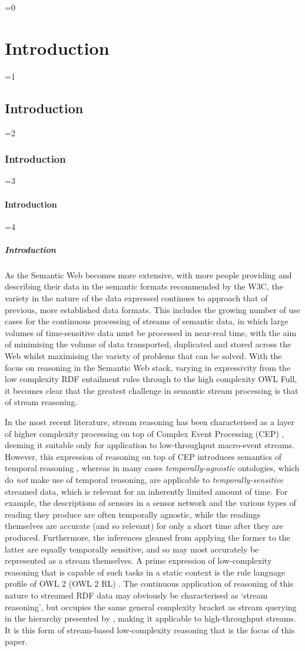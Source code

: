 \documentclass[twocolumn,preprint,3p,number]{elsarticle}
\theoremstyle{plain}
\theoremstyle{definition}
\newcounter{nestingdepth}
\newenvironment{nestedsection}[2]{
  \ifnum\value{nestingdepth}=0
    \chapter{#1}
  \else
    \ifnum\value{nestingdepth}=1
      \section{#1}
    \else
      \ifnum\value{nestingdepth}=2
        \subsection{#1}
      \else
        \ifnum\value{nestingdepth}=3
          \subsubsection{#1}
        \else
          \ifnum\value{nestingdepth}=4
            \paragraph{#1}
          \else
            \PackageError{nestedsections}{Maximum nesting level exceeded!}{uh oh!}
          \fi
        \fi
      \fi
    \fi
  \fi
  \addtocounter{nestingdepth}{1}
  \label{sec:#2}
}{\addtocounter{nestingdepth}{-1}}
\begin{document}
\begin{nestedsection}{Introduction}{intro}
  As the Semantic Web becomes more extensive, with more people providing and describing their data in the semantic formats recommended by the W3C, the variety in the nature of the data expressed continues to approach that of previous, more established data formats.
  This includes the growing number of use cases for the continuous processing of streams of semantic data, in which large volumes of time-sensitive data must be processed in near-real time, with the aim of minimising the volume of data transported, duplicated and stored across the Web whilst maximising the variety of problems that can be solved.
  With the focus on reasoning in the Semantic Web stack, varying in expressivity from the low complexity RDF entailment rules through to the high complexity OWL Full, it becomes clear that the greatest challenge in semantic stream processing is that of stream reasoning.

  In the most recent literature, stream reasoning has been characterised as a layer of higher complexity processing on top of Complex Event Processing (CEP) \citep{mileo15webSR}, deeming it suitable only for application to low-throughput macro-event streams.
  However, this expression of reasoning on top of CEP introduces semantics of temporal reasoning \citep{OrgunWadge92,Tuzhilin93}, whereas in many cases \emph{temporally-agnostic} ontologies, which do \emph{not} make use of temporal reasoning, are applicable to \emph{temporally-sensitive} streamed data, which is relevant for an inherently limited amount of time.
  For example, the descriptions of sensors in a sensor network and the various types of reading they produce are often temporally agnostic, while the readings themselves are accurate (and so relevant) for only a short time after they are produced.
  Furthermore, the inferences gleaned from applying the former to the latter are equally temporally sensitive, and so may most accurately be represented as a stream themselves.
  A prime expression of low-complexity reasoning that is capable of such tasks in a static context is the rule language profile of OWL 2 (OWL 2 RL) \citep{w3cowl2profiles}.
  The continuous application of reasoning of this nature to streamed RDF data may obviously be characterised as `stream reasoning', but occupies the same general complexity bracket as stream querying in the hierarchy presented by \citep{mileo15webSR}, making it applicable to high-throughput streams.
  It is this form of stream-based low-complexity reasoning that is the focus of this paper.


\end{nestedsection}
\end{document}
